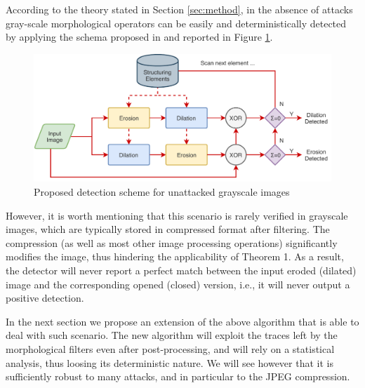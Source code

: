 \documentclass[review]{elsarticle}
\begin{document}
According to the theory stated in Section \ref{sec:method}, in the absence of attacks gray-scale morphological operators can be easily and deterministically detected by applying the schema proposed in \cite{de2017detecting} and reported in Figure \ref{fig:scheme}.

\begin{figure}[!ht]
	\centering
	\includegraphics[width=0.8\linewidth]{diagram1}
	\caption{Proposed detection scheme for unattacked grayscale images}
	\label{fig:scheme}
\end{figure}

However, it is worth mentioning that this scenario is rarely verified in grayscale images, which are typically stored in compressed format after filtering. The compression (as well as most other image processing operations) significantly modifies the image, thus hindering the applicability of Theorem 1. As a result, the detector will never report a perfect match between the input eroded (dilated) image and the corresponding opened (closed) version, i.e., it will never output a positive detection.

In the next section we propose an extension of the above algorithm that is able to deal with such scenario. The new algorithm will exploit the traces left by the morphological filters even after post-processing, and will rely on a statistical analysis, thus loosing its deterministic nature. We will see however that it is sufficiently robust to many attacks, and in particular to the JPEG compression.
\end{document}
